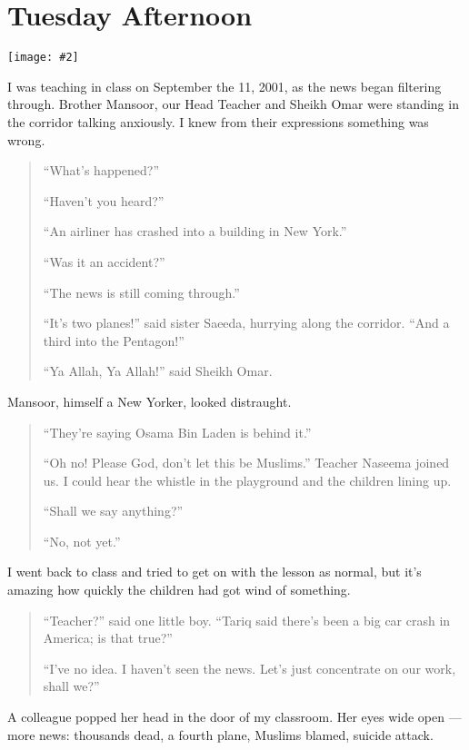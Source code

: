 \documentclass[12pt]{memoir}
\newcommand{\img}[3]{\begin{center}%
\texttt{[image: \#2]}\\{\small\em#3}%
\end{center}}
\begin{document}
\chapter{Tuesday Afternoon}

\img{scale=0.4}{911_Second_Plane.jpg}{}

I was teaching in class on September the 11, 2001,
as the news began filtering through.
Brother Mansoor, our Head Teacher and Sheikh Omar
were standing in the corridor talking anxiously.
I knew from their expressions something was wrong.

\begin{quote}
“What’s happened?”

“Haven’t you heard?”

“An airliner has crashed into a building in New York.”

“Was it an accident?”

“The news is still coming through.”

“It’s two planes!” said sister Saeeda, hurrying along the corridor.
“And a third into the Pentagon!”

“Ya Allah, Ya Allah!” said Sheikh Omar.
\end{quote}

Mansoor, himself a New Yorker, looked distraught.

\begin{quote}
“They’re saying Osama Bin Laden is behind it.”

“Oh no! Please God, don’t let this be Muslims.” Teacher Naseema joined us.
I could hear the whistle in the playground and the children lining up.

“Shall we say anything?”

“No, not yet.”
\end{quote}

I went back to class and tried to get on with the lesson as normal,
but it’s amazing how quickly the children had got wind of something.

\begin{quote}
“Teacher?” said one little boy.
“Tariq said there’s been a big car crash in America; is that true?”

“I’ve no idea.
I haven’t seen the news.
Let’s just concentrate on our work, shall we?”
\end{quote}

A colleague popped her head in the door of my classroom.
Her eyes wide open — more news:
thousands dead, a fourth plane, Muslims blamed, suicide attack.
\end{document}

